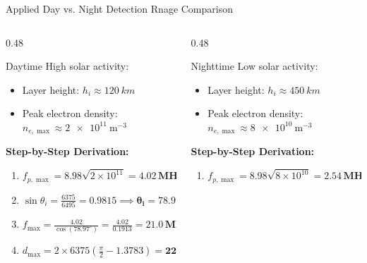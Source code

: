 \documentclass[aspectratio=169, 10pt]{beamer}
\newcommand{\km}{km} %
\begin{document}
\begin{frame}{Applied Day vs. Night Detection Rnage Comparison}
    \begin{columns}[T]
        \begin{column}{0.48\textwidth}
            \begin{block}{Daytime}
                High solar activity:
                \begin{itemize}
                    \item Layer height: $h_i \approx \SI{120}{\km}$
                    \item Peak electron density: $n_{e,\max} \approx \SI{2e11}{\m^{-3}}$
                \end{itemize}
                \textbf{Step-by-Step Derivation:}
                \begin{enumerate}
                    \item $f_{p,\max} = 8.98\sqrt{2\times 10^{11}} = \mathbf{4.02\,\si{\mega\hertz}}$
                    \item $\sin\theta_i = \frac{6375}{6495} = 0.9815 \implies \mathbf{\theta_i = 78.97^\circ}$
                    \item $f_{\max} = \frac{4.02}{\cos(78.97^\circ)} = \frac{4.02}{0.1913} = \mathbf{21.0\,\si{\mega\hertz}}$
                    \item $d_{\max} = 2 \times 6375 \left(\frac{\pi}{2} - 1.3783\right) = \mathbf{2248\,\si{\km}}$
                \end{enumerate}
            \end{block}
        \end{column}
        \begin{column}{0.48\textwidth}
            \begin{block}{Nighttime}
                Low solar activity:
                \begin{itemize}
                    \item Layer height: $h_i \approx \SI{450}{\km}$
                    \item Peak electron density: $n_{e,\max} \approx \SI{8e10}{\m^{-3}}$
                \end{itemize}
                \textbf{Step-by-Step Derivation:}
                \begin{enumerate}
                    \item $f_{p,\max} = 8.98\sqrt{8\times 10^{10}} = \mathbf{2.54\,\si{\mega\hertz}}$

\end{enumerate}
\end{block}
\end{column}
\end{columns}
\end{frame}
\end{document}
